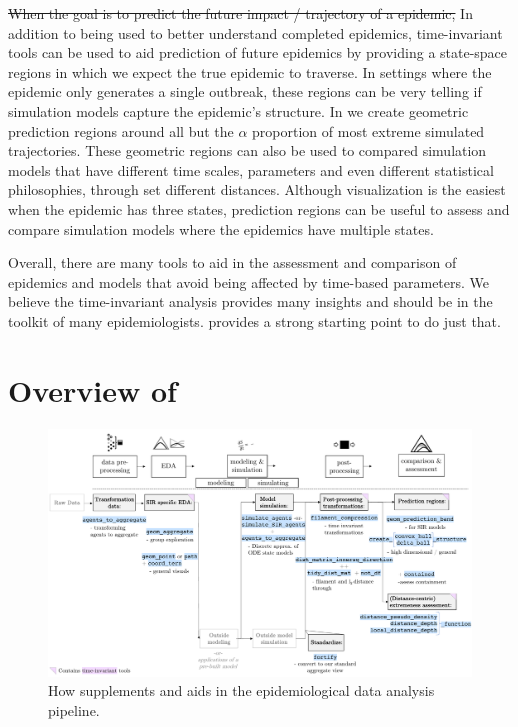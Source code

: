 \documentclass[
  shortnames]{jss}
\begin{document}
\sout{When the goal is to predict the future impact / trajectory of a epidemic,}
In addition to being used to better understand completed epidemics,
time-invariant tools can be used to aid prediction of future epidemics
by providing a state-space regions in which we expect the true epidemic
to traverse. In settings where the epidemic only generates a single
outbreak, these regions can be very telling if simulation models capture
the epidemic's structure. In  we create geometric
prediction regions around all but the \(\alpha\) proportion of most
extreme simulated trajectories. These geometric regions can also be used
to compared simulation models that have different time scales,
parameters and even different statistical philosophies, through set
different distances. Although visualization is the easiest when the
epidemic has three states, prediction regions can be useful to assess
and compare simulation models where the epidemics have multiple states.

Overall, there are many tools to aid in the assessment and comparison of
epidemics and models that avoid being affected by time-based parameters.
We believe the time-invariant analysis provides many insights and should
be in the toolkit of many epidemiologists.  provides a
strong starting point to do just that.

\section[Package overview]{Overview of
}\label{sec:overview}

\afterpage{\clearpage}
\begin{figure}
    \centering
    \includegraphics[width = 1\textwidth]{images/pipeline2_1.pdf}
    \caption{How  supplements and aids in the epidemiological data analysis pipeline.}
    \label{fig:pipeline2}
\end{figure}
\end{document}
